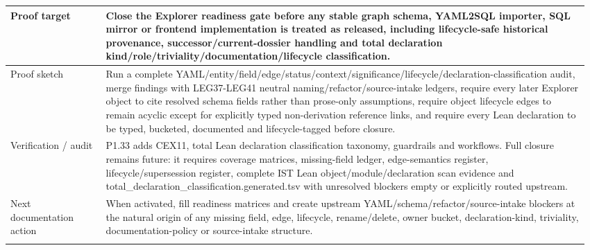 \begin{longtable}{L{0.16\linewidth} L{0.81\linewidth}}
Proof target & Close the Explorer readiness gate before any stable graph schema, YAML2SQL importer, SQL mirror or frontend implementation is treated as released, including lifecycle-safe historical provenance, successor/\allowbreak{}current-dossier handling and total declaration kind/\allowbreak{}role/\allowbreak{}triviality/\allowbreak{}documentation/\allowbreak{}lifecycle classification.\\
\hline\addlinespace[0.20em]
Proof sketch & Run a complete YAML/\allowbreak{}entity/\allowbreak{}field/\allowbreak{}edge/\allowbreak{}status/\allowbreak{}context/\allowbreak{}significance/\allowbreak{}lifecycle/\allowbreak{}declaration-classification audit, merge findings with LEG37-LEG41 neutral naming/\allowbreak{}refactor/\allowbreak{}source-intake ledgers, require every later Explorer object to cite resolved schema fields rather than prose-only assumptions, require object lifecycle edges to remain acyclic except for explicitly typed non-derivation reference links, and require every Lean declaration to be typed, bucketed, documented and lifecycle-tagged before closure.\\
\hline\addlinespace[0.20em]
Verification /\allowbreak{} audit & P1.33 adds CEX11, total Lean declaration classification taxonomy, guardrails and workflows. Full closure remains future: it requires coverage matrices, missing-field ledger, edge-semantics register, lifecycle/\allowbreak{}supersession register, complete IST Lean object/\allowbreak{}module/\allowbreak{}declaration scan evidence and total\_declaration\_classification.generated.tsv with unresolved blockers empty or explicitly routed upstream.\\
\hline\addlinespace[0.20em]
Next documentation action & When activated, fill readiness matrices and create upstream YAML/\allowbreak{}schema/\allowbreak{}refactor/\allowbreak{}source-intake blockers at the natural origin of any missing field, edge, lifecycle, rename/\allowbreak{}delete, owner bucket, declaration-kind, triviality, documentation-policy or source-intake structure.\\
\hline\addlinespace[0.20em]
\end{longtable}
